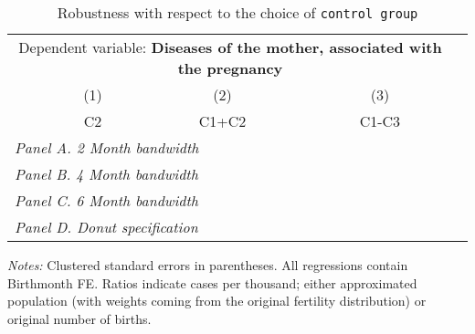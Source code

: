  \begin{table}[H] \begin{threeparttable} \centering \caption{Robustness with respect to the choice of \texttt{control group}} {\def\sym#1{\ifmmode^{#1}\else\(^{#1}\)\fi} \begin{tabular}{l*{4}{c}} \toprule \multicolumn{4}{c}{Dependent variable: \textbf{Diseases of the mother, associated with the pregnancy}} \\ \cmidrule(lr){2-4}
            &\multicolumn{1}{c}{(1)}&\multicolumn{1}{c}{(2)}&\multicolumn{1}{c}{(3)}\\
            &\multicolumn{1}{c}{C2}&\multicolumn{1}{c}{C1+C2}&\multicolumn{1}{c}{C1-C3}\\
\midrule
 \multicolumn{4}{l}{\emph{Panel A. 2 Month bandwidth}} \\    \midrule\multicolumn{4}{l}{\emph{Panel B. 4 Month bandwidth}} \\    \midrule\multicolumn{4}{l}{\emph{Panel C. 6 Month bandwidth}} \\    \midrule\multicolumn{4}{l}{\emph{Panel D. Donut specification}} \\    
\bottomrule \end{tabular} } \begin{tablenotes} \item \scriptsize \emph{Notes:} Clustered standard errors in parentheses. All regressions contain Birthmonth FE. Ratios indicate cases per thousand; either approximated population (with weights coming from the original fertility distribution) or original number of births. \end{tablenotes} \end{threeparttable} \end{table} 
